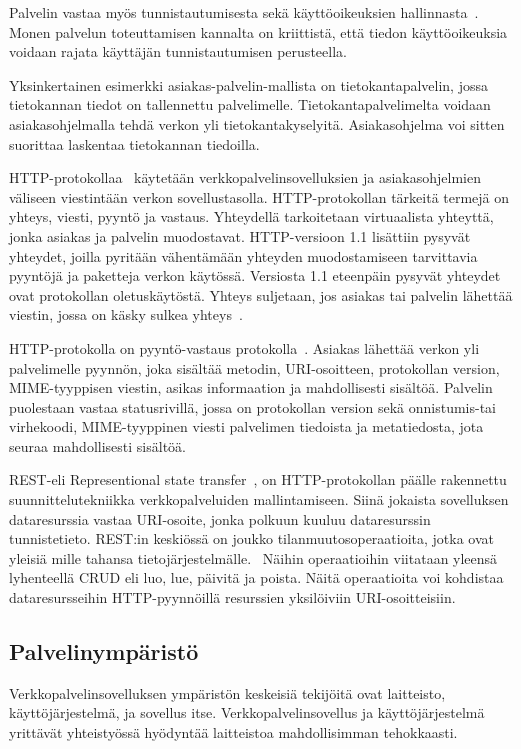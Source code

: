 \documentclass[finnish]{tktltiki2}%
\theoremstyle{definition}
\theoremstyle{remark}
\begin{document}
Palvelin vastaa myös tunnistautumisesta sekä käyttöoikeuksien hallinnasta~\cite{pai_flash_1999}.
Monen palvelun toteuttamisen kannalta on kriittistä, että
tiedon käyttöoikeuksia voidaan rajata käyttäjän tunnistautumisen perusteella.

Yksinkertainen esimerkki asiakas-palvelin-mallista on tietokantapalvelin,
jossa tietokannan tiedot on tallennettu palvelimelle. Tietokantapalvelimelta
voidaan asiakasohjelmalla tehdä verkon yli tietokantakyselyitä. Asiakasohjelma
voi sitten suorittaa laskentaa tietokannan tiedoilla.

HTTP-protokollaa~\cite{leach_hypertext} käytetään verkkopalvelinsovelluksien ja
asiakasohjelmien väliseen viestintään verkon sovellustasolla.
HTTP-protokollan tärkeitä termejä on yhteys, viesti, pyyntö ja vastaus.
Yhteydellä tarkoitetaan virtuaalista yhteyttä, jonka asiakas ja palvelin muodostavat.
HTTP-versioon 1.1 lisättiin pysyvät yhteydet, joilla pyritään
vähentämään yhteyden muodostamiseen tarvittavia pyyntöjä ja paketteja verkon
käytössä. Versiosta 1.1 eteenpäin pysyvät yhteydet ovat protokollan
oletuskäytöstä. Yhteys suljetaan, jos asiakas tai palvelin lähettää
viestin, jossa on käsky sulkea yhteys~\cite{leach_hypertext}.

HTTP-protokolla on pyyntö-vastaus protokolla~\cite{leach_hypertext}. Asiakas lähettää
verkon yli palvelimelle pyynnön, joka sisältää metodin, URI-osoitteen, protokollan
version, MIME-tyyppisen viestin, asikas informaation ja mahdollisesti
sisältöä. Palvelin puolestaan vastaa statusrivillä, jossa on protokollan
version sekä onnistumis-tai virhekoodi, MIME-tyyppinen viesti palvelimen
tiedoista ja metatiedosta, jota seuraa mahdollisesti sisältöä.


REST-eli Representional state transfer~\cite{battle_bridging_2008}, on HTTP-protokollan
päälle rakennettu suunnittelutekniikka verkkopalveluiden mallintamiseen.
Siinä jokaista sovelluksen dataresurssia vastaa URI-osoite,
jonka polkuun kuuluu dataresurssin tunnistetieto.
REST:in keskiössä on joukko tilanmuutosoperaatioita,
jotka ovat yleisiä mille tahansa tietojärjestelmälle. 
Näihin operaatioihin viitataan yleensä lyhenteellä CRUD eli 
luo, lue, päivitä ja poista.
Näitä operaatioita voi kohdistaa dataresursseihin
HTTP-pyynnöillä resurssien yksilöiviin URI-osoitteisiin.

\subsection{Palvelinympäristö}
Verkkopalvelinsovelluksen ympäristön keskeisiä
tekijöitä ovat laitteisto, käyttöjärjestelmä, ja sovellus itse.
Verkkopalvelinsovellus ja käyttöjärjestelmä
yrittävät yhteistyössä hyödyntää laitteistoa
mahdollisimman tehokkaasti.
\end{document}
